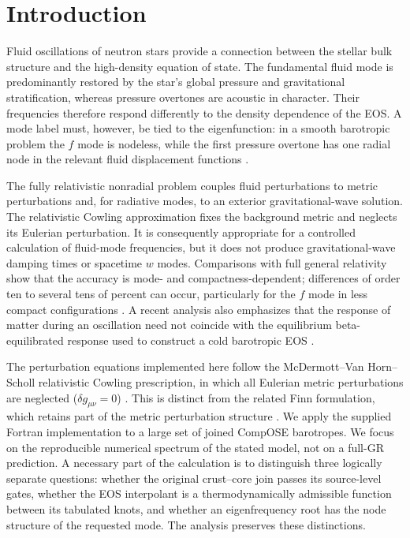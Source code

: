 \documentclass[aps,prd,twocolumn,superscriptaddress,nofootinbib]{revtex4-2}
\begin{document}
\section{Introduction}

Fluid oscillations of neutron stars provide a connection between the stellar bulk structure and the high-density equation of state. The fundamental fluid mode is predominantly restored by the star's global pressure and gravitational stratification, whereas pressure overtones are acoustic in character. Their frequencies therefore respond differently to the density dependence of the EOS. A mode label must, however, be tied to the eigenfunction: in a smooth barotropic problem the $f$ mode is nodeless, while the first pressure overtone has one radial node in the relevant fluid displacement functions \cite{Kokkotas1996,Finn1988}.

The fully relativistic nonradial problem couples fluid perturbations to metric perturbations and, for radiative modes, to an exterior gravitational-wave solution. The relativistic Cowling approximation fixes the background metric and neglects its Eulerian perturbation. It is consequently appropriate for a controlled calculation of fluid-mode frequencies, but it does not produce gravitational-wave damping times or spacetime $w$ modes. Comparisons with full general relativity show that the accuracy is mode- and compactness-dependent; differences of order ten to several tens of percent can occur, particularly for the $f$ mode in less compact configurations \cite{YoshidaKojima1997,Kokkotas1996}. A recent analysis also emphasizes that the response of matter during an oscillation need not coincide with the equilibrium beta-equilibrated response used to construct a cold barotropic EOS \cite{Montefusco2025}.

The perturbation equations implemented here follow the McDermott--Van Horn--Scholl relativistic Cowling prescription, in which all Eulerian metric perturbations are neglected ($\delta g_{\mu\nu}=0$) \cite{McDermott1983}. This is distinct from the related Finn formulation, which retains part of the metric perturbation structure \cite{Finn1988}. We apply the supplied Fortran implementation to a large set of joined CompOSE barotropes. We focus on the reproducible numerical spectrum of the stated model, not on a full-GR prediction. A necessary part of the calculation is to distinguish three logically separate questions: whether the original crust--core join passes its source-level gates, whether the EOS interpolant is a thermodynamically admissible function between its tabulated knots, and whether an eigenfrequency root has the node structure of the requested mode. The analysis preserves these distinctions.
\end{document}
